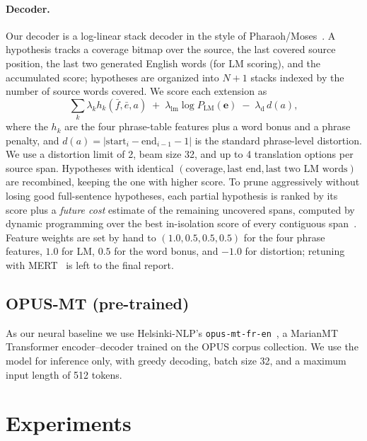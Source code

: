 \documentclass[11pt]{article}
\begin{document}
\paragraph{Decoder.} Our decoder is a log-linear stack decoder in the style of Pharaoh/Moses~\cite{koehn-2004-pharaoh}. A hypothesis tracks a coverage bitmap over the source, the last covered source position, the last two generated English words (for LM scoring), and the accumulated score; hypotheses are organized into $N+1$ stacks indexed by the number of source words covered. We score each extension as
\begin{equation}
\sum_{k} \lambda_k h_k(\bar{f}, \bar{e}, a) \;+\; \lambda_{\text{lm}} \log P_{\text{LM}}(\mathbf{e}) \;-\; \lambda_{\text{d}} \, d(a),
\end{equation}
where the $h_k$ are the four phrase-table features plus a word bonus and a phrase penalty, and $d(a) = |\mathrm{start}_i - \mathrm{end}_{i-1} - 1|$ is the standard phrase-level distortion. We use a distortion limit of 2, beam size 32, and up to 4 translation options per source span. Hypotheses with identical $(\text{coverage}, \text{last end}, \text{last two LM words})$ are recombined, keeping the one with higher score. To prune aggressively without losing good full-sentence hypotheses, each partial hypothesis is ranked by its score plus a \emph{future cost} estimate of the remaining uncovered spans, computed by dynamic programming over the best in-isolation score of every contiguous span~\cite{koehn-etal-2003-statistical}. Feature weights are set by hand to $(1.0, 0.5, 0.5, 0.5)$ for the four phrase features, $1.0$ for LM, $0.5$ for the word bonus, and $-1.0$ for distortion; retuning with MERT~\cite{och-2003-minimum} is left to the final report.
 
\subsection{OPUS-MT (pre-trained)}
\label{sec:opus}
 
As our neural baseline we use Helsinki-NLP's \texttt{opus-mt-fr-en}~\cite{tiedemann-thottingal-2020-opus}, a MarianMT~\cite{junczys-dowmunt-etal-2018-marian} Transformer encoder--decoder trained on the OPUS corpus collection. We use the model for inference only, with greedy decoding, batch size 32, and a maximum input length of 512 tokens.
 
\section{Experiments}
\label{sec:experiments}
 
\end{document}
